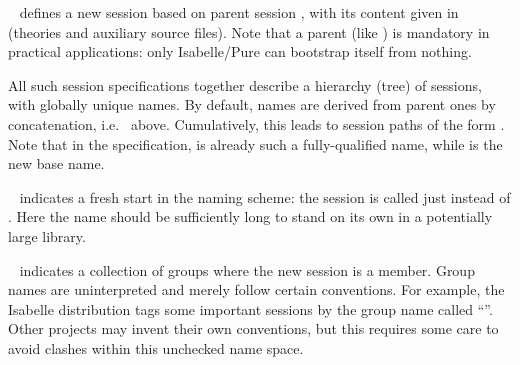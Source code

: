 \begin{isabellebody}
\begin{isamarkuptext}
  \begin{description}

  \item {}~ defines a new
  session  based on parent session , with its
  content given in  (theories and auxiliary source files).
  Note that a parent (like ) is mandatory in practical
  applications: only Isabelle/Pure can bootstrap itself from nothing.

  All such session specifications together describe a hierarchy (tree)
  of sessions, with globally unique names.  By default, names are
  derived from parent ones by concatenation, i.e.\ 
  above.  Cumulatively, this leads to session paths of the form .  Note that in the specification,
   is already such a fully-qualified name, while 
  is the new base name.

  \item {}~ indicates a fresh start
  in the naming scheme: the session is called just  instead
  of .  Here the name  should be
  sufficiently long to stand on its own in a potentially large
  library.

  \item {}~ indicates a
  collection of groups where the new session is a member.  Group names
  are uninterpreted and merely follow certain conventions.  For
  example, the Isabelle distribution tags some important sessions by
  the group name called ``''.  Other projects may invent
  their own conventions, but this requires some care to avoid clashes
  within this unchecked name space.


\end{description}
\end{isamarkuptext}
\end{isabellebody}
